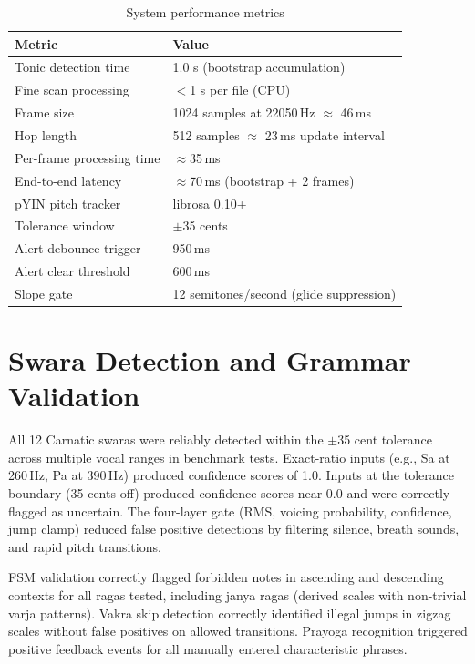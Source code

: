 \documentclass[12pt,a4paper]{report}
\numberwithin{equation}{chapter}
\begin{document}
\begin{table}[htbp]
\centering
\caption{System performance metrics}
\label{tab:perf}
\begin{tabular}{|l|l|}
\hline
\textbf{Metric} & \textbf{Value} \\
\hline
Tonic detection time & 1.0 s (bootstrap accumulation) \\
Fine scan processing & $<$1 s per file (CPU) \\
Frame size & 1024 samples at 22050\,Hz $\approx$ 46\,ms \\
Hop length & 512 samples $\approx$ 23\,ms update interval \\
Per-frame processing time & $\approx$35\,ms \\
End-to-end latency & $\approx$70\,ms (bootstrap + 2 frames) \\
pYIN pitch tracker & librosa 0.10+ \\
Tolerance window & $\pm$35 cents \\
Alert debounce trigger & 950\,ms \\
Alert clear threshold & 600\,ms \\
Slope gate & 12 semitones/second (glide suppression) \\
\hline
\end{tabular}
\end{table}

\section{Swara Detection and Grammar Validation}
All 12 Carnatic swaras were reliably detected within the $\pm$35 cent tolerance across multiple vocal ranges in benchmark tests. Exact-ratio inputs (e.g., Sa at 260\,Hz, Pa at 390\,Hz) produced confidence scores of 1.0. Inputs at the tolerance boundary (35 cents off) produced confidence scores near 0.0 and were correctly flagged as uncertain. The four-layer gate (RMS, voicing probability, confidence, jump clamp) reduced false positive detections by filtering silence, breath sounds, and rapid pitch transitions.

FSM validation correctly flagged forbidden notes in ascending and descending contexts for all ragas tested, including janya ragas (derived scales with non-trivial varja patterns). Vakra skip detection correctly identified illegal jumps in zigzag scales without false positives on allowed transitions. Prayoga recognition triggered positive feedback events for all manually entered characteristic phrases.
\end{document}
